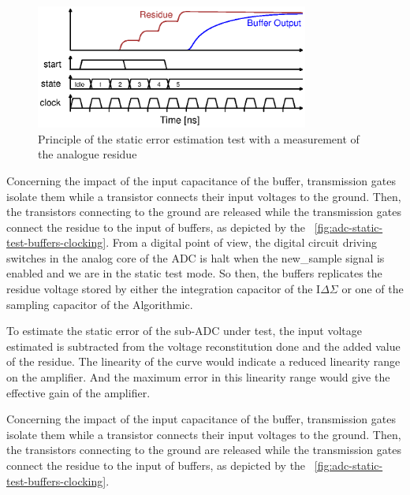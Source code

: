 \begin{figure}[htp]
    \centering
    \includegraphics[width=0.8\textwidth]{Chapter5/Figs/adc_chip/static-test-principle.ps}
    \caption{Principle of the static error estimation test with a measurement of the analogue residue}
    \label{fig:adc-static-test}
\end{figure}

Concerning the impact of the input capacitance of the buffer, transmission gates isolate them while a transistor connects their input voltages to the ground. Then, the transistors connecting to the ground are released while the transmission gates connect the residue to the input of buffers, as depicted by the \figurename~\ref{fig:adc-static-test-buffers-clocking}. From a digital point of view, the digital circuit driving switches in the analog core of the ADC is halt when the new\_sample signal is enabled and we are in the static test mode. So then, the buffers replicates the residue voltage stored by either the integration capacitor of the I\(\Delta \Sigma\) or one of the sampling capacitor of the Algorithmic.

To estimate the static error of the sub-ADC under test, the input voltage estimated is subtracted from the voltage reconstitution done and the added value of the residue. The linearity of the curve would indicate a reduced linearity range on the amplifier. And the maximum error in this linearity range would give the effective gain of the amplifier.

Concerning the impact of the input capacitance of the buffer, transmission gates isolate them while a transistor connects their input voltages to the ground. Then, the transistors connecting to the ground are released while the transmission gates connect the residue to the input of buffers, as depicted by the \figurename~\ref{fig:adc-static-test-buffers-clocking}.

